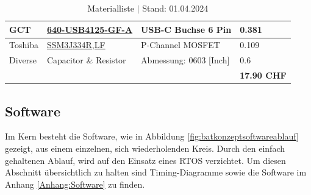 \documentclass[12pt]{article}
\begin{document}
\begin{table}[!ht]
\begin{tabular}{|l|l|l|l|}
		GCT & \href{https://www.mouser.ch/ProductDetail/GCT/USB4125-GF-A?qs=KUoIvG\%2F9IlaIQ4zBJ6gLeA\%3D\%3D}{640-USB4125-GF-A} & USB-C Buchse 6 Pin & 0.381 \\ \hline
		Toshiba & \href{https://www.mouser.ch/ProductDetail/Toshiba/SSM3J334RLF?qs=PiFplXvYe5VBSYhr6TJz8A\%3D\%3D}{SSM3J334R,LF} & P-Channel MOSFET & 0.109 \\ \hline
		Diverse & Capacitor \& Resistor & Abmessung: 0603 [Inch] & 0.6 \\\hline
		~ & ~ & ~ & \textbf{17.90 CHF} \\ \hline
	\end{tabular}
	\caption{Materialliste $\vert$ Stand: 01.04.2024}
	\label{table:materialliste}
\end{table}
	\subsection{Software}
	Im Kern besteht die Software, wie in Abbildung \ref{fig:batkonzeptsoftwareablauf} gezeigt, aus einem einzelnen, sich wiederholenden Kreis. Durch den einfach gehaltenen Ablauf, wird auf den Einsatz eines RTOS verzichtet. Um diesen Abschnitt übersichtlich zu halten sind Timing-Diagramme sowie die Software im Anhang \ref{Anhang:Software} zu finden.
\end{document}
